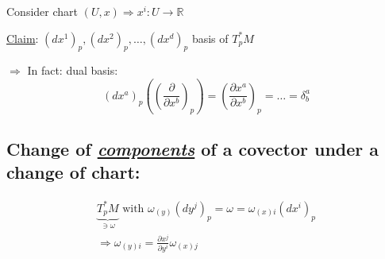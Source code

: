 \begin{theorem}
  Consider chart $(U,x)  \Longrightarrow x^i : U \to \mathbb{R}$  

\underline{Claim}: $(d x^1)_p, (dx^2)_p, \dots , (dx^d)_p$ basis of $T_p^*M$ 

$\Longrightarrow $ In fact: dual basis: 
\[
(dx^a)_p \left( \left( \frac{ \partial }{ \partial x^b} \right)_p \right) = \left( \frac{ \partial x^a}{ \partial x^b} \right)_p = \dots = \delta_b^a
\]
\end{theorem}

\subsection{Change of \emph{ \underline{components} } of a covector under a change of chart: }

\[
\begin{gathered}
  \underbrace{ T_p^*M }_{ \ni \omega} \text{ with } 
\omega_{(y)} (dy^j)_p =   \omega = \omega_{(x)i} (dx^i)_p  \\
\Longrightarrow \boxed{ \omega_{(y)i} = \frac{ \partial x^j}{ \partial y^i } \omega_{(x)j } }
\end{gathered}
\]
